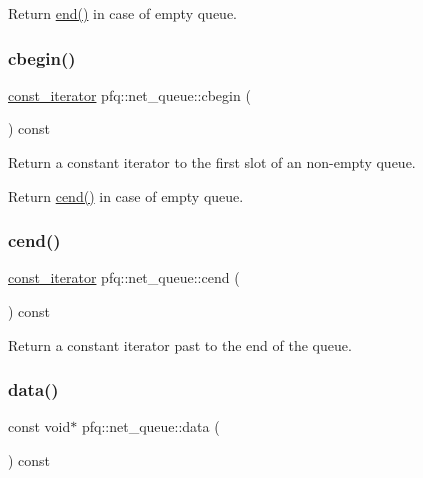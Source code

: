 Return \hyperlink{classpfq_1_1net__queue_acef930aef921f06803621af79f993b25}{end()} in case of empty queue. \mbox{\label{classpfq_1_1net__queue_a9982c6ba98df15e89f0cb8bb6d9add0e}} 
\subsubsection{\texorpdfstring{cbegin()}{cbegin()}}
{\footnotesize\ttfamily \hyperlink{structpfq_1_1net__queue_1_1const__iterator}{const\+\_\+iterator} pfq\+::net\+\_\+queue\+::cbegin (\begin{DoxyParamCaption}{ }\end{DoxyParamCaption}) const\hspace{0.3cm}{\ttfamily [inline]}}



Return a constant iterator to the first slot of an non-\/empty queue. 

Return \hyperlink{classpfq_1_1net__queue_ae8bf00c5db4e81f8c0a2c45c12f16768}{cend()} in case of empty queue. \mbox{\label{classpfq_1_1net__queue_ae8bf00c5db4e81f8c0a2c45c12f16768}} 
\subsubsection{\texorpdfstring{cend()}{cend()}}
{\footnotesize\ttfamily \hyperlink{structpfq_1_1net__queue_1_1const__iterator}{const\+\_\+iterator} pfq\+::net\+\_\+queue\+::cend (\begin{DoxyParamCaption}{ }\end{DoxyParamCaption}) const\hspace{0.3cm}{\ttfamily [inline]}}



Return a constant iterator past to the end of the queue. 

\mbox{\label{classpfq_1_1net__queue_a83e4a9bb3f4625bb5e405b853c15eebf}} 
\subsubsection{\texorpdfstring{data()}{data()}}
{\footnotesize\ttfamily const void$\ast$ pfq\+::net\+\_\+queue\+::data (\begin{DoxyParamCaption}{ }\end{DoxyParamCaption}) const\hspace{0.3cm}{\ttfamily [inline]}}




